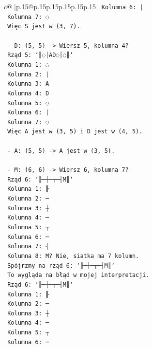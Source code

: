 \documentclass{article}
\begin{document}
{\begin{supertabular}{c@{$\;$}|p{.15\linewidth}@{}p{.15\linewidth}p{.15\linewidth}p{.15\linewidth}p{.15\linewidth}p{.15\linewidth}}
{{{\texttt{    Kolumna 6: |} \\
\texttt{    Kolumna 7: ◌} \\
\texttt{    Więc S jest w (3, 7).} \\
\\ 
\texttt{  {-} D: (5, 5) {-}> Wiersz 5, kolumna 4?} \\
\texttt{    Rząd 5: `║◌│AD◌│◌║`} \\
\texttt{    Kolumna 1: ◌} \\
\texttt{    Kolumna 2: |} \\
\texttt{    Kolumna 3: A} \\
\texttt{    Kolumna 4: D} \\
\texttt{    Kolumna 5: ◌} \\
\texttt{    Kolumna 6: |} \\
\texttt{    Kolumna 7: ◌} \\
\texttt{    Więc A jest w (3, 5) i D jest w (4, 5).} \\
\\ 
\texttt{  {-} A: (5, 5) {-}> A jest w (3, 5).} \\
\\ 
\texttt{  {-} M: (6, 6) {-}> Wiersz 6, kolumna 7?} \\
\texttt{    Rząd 6: `╟─┼─┬─┤M║`} \\
\texttt{    Kolumna 1: ╟} \\
\texttt{    Kolumna 2: ─} \\
\texttt{    Kolumna 3: ┼} \\
\texttt{    Kolumna 4: ─} \\
\texttt{    Kolumna 5: ┬} \\
\texttt{    Kolumna 6: ─} \\
\texttt{    Kolumna 7: ┤} \\
\texttt{    Kolumna 8: M? Nie, siatka ma 7 kolumn.} \\
\texttt{    Spójrzmy na rząd 6: `╟─┼─┬─┤M║`} \\
\texttt{    To wygląda na błąd w mojej interpretacji.} \\
\texttt{    Rząd 6: `╟─┼─┬─┤M║`} \\
\texttt{    Kolumna 1: ╟} \\
\texttt{    Kolumna 2: ─} \\
\texttt{    Kolumna 3: ┼} \\
\texttt{    Kolumna 4: ─} \\
\texttt{    Kolumna 5: ┬} \\
\texttt{    Kolumna 6: ─} \\
}}}
\end{supertabular}}
\end{document}

